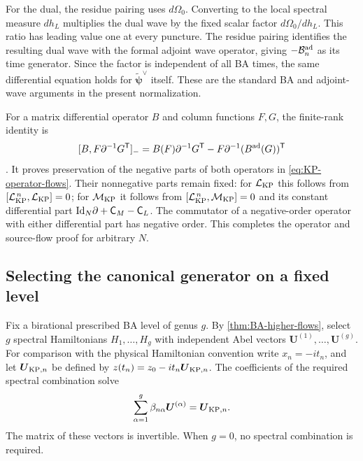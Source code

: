 For the dual, the residue pairing uses $d\Omega_0$.
Converting to the local spectral measure $dh_L$ multiplies the dual
wave by the fixed scalar factor $d\Omega_0/dh_L$. This ratio has
leading value one at every puncture. The residue pairing identifies
the resulting dual wave with the formal adjoint wave operator,
giving $-\mathcal B_n^{\rm ad}$ as its time generator. Since the
factor is independent of all BA times, the same differential
equation holds for $\widetilde{\boldsymbol\psi}^{\vee}$ itself.
These are the standard BA and adjoint-wave arguments
\cite{Krichever1977,KricheverShiota2011} in the present normalization.

For a matrix differential operator $B$ and column functions $F,G$,
the finite-rank identity is
\[
 [B,F\partial^{-1}G^{\mathsf T}]_-
 =B(F)\partial^{-1}G^{\mathsf T}
  -F\partial^{-1}(B^{\rm ad}(G))^{\mathsf T}
\]
\cite[equations (7)--(8)]{ChvartatskyiSydorenko2013}.
It proves preservation of the negative parts of both operators in
\cref{eq:KP-operator-flows}. Their nonnegative parts remain fixed:
for $\mathcal L_{\rm KP}$ this follows from
$[\mathcal L_{\rm KP}^{\,n},\mathcal L_{\rm KP}]=0$; for
$\mathcal M_{\rm KP}$ it follows from
$[\mathcal L_{\rm KP}^{\,n},\mathcal M_{\rm KP}]=0$ and its constant
differential part $\mathrm{Id}_N\partial+\mathsf C_M-\mathsf C_L$.
The commutator of a negative-order operator with either differential
part has negative order. This completes the operator and source-flow
proof for arbitrary $N$.

\subsection{Selecting the canonical generator on a fixed level}

Fix a birational prescribed BA level of genus $g$. By
\cref{thm:BA-higher-flows}, select $g$ spectral Hamiltonians
$H_1,\ldots,H_g$ with independent Abel vectors
$\boldsymbol U^{(1)},\ldots,\boldsymbol U^{(g)}$.
For comparison with the physical Hamiltonian convention write
$x_n=-it_n$, and let $\boldsymbol U_{{\rm KP},n}$ be defined by
$z(t_n)=z_0-it_n\boldsymbol U_{{\rm KP},n}$.
The coefficients of the required spectral combination solve
\begin{equation}\label{eq:KP-Abel-linear-match}
 \sum_{\alpha=1}^{g}\beta_{n\alpha}\boldsymbol U^{(\alpha)}
 =\boldsymbol U_{{\rm KP},n}.
\end{equation}
The matrix of these vectors is invertible. When $g=0$, no spectral
combination is required.

